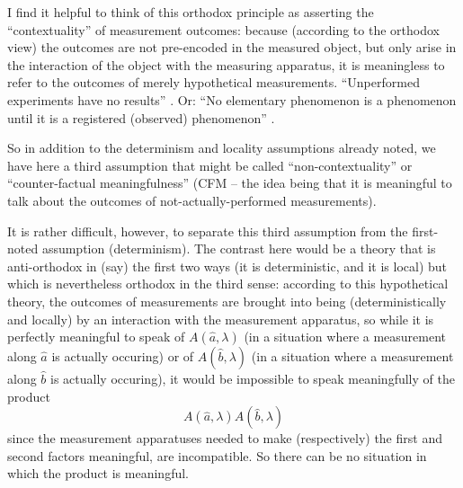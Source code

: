 \documentclass[aps,prc,onecolumn,12pt,nofootinbib]{revtex4-2}
\begin{document}
I find it helpful to think of this orthodox principle as asserting the
``contextuality'' of measurement outcomes:  because (according to the
orthodox view) the outcomes are not pre-encoded in the measured object, but
only arise in the interaction of the  object with the measuring
apparatus, it is meaningless to refer to the outcomes of merely
hypothetical measurements.  ``Unperformed experiments have no
results'' \cite{peres}.  Or:  ``No elementary phenomenon is a
phenomenon until it is a registered (observed) phenomenon'' \cite{wheeler}.

So in addition to the determinism and locality assumptions already
noted, we have here a third assumption that might be called
``non-contextuality'' or ``counter-factual meaningfulness'' (CFM --
the idea being that it is meaningful to talk about the outcomes of
not-actually-performed measurements).

It is rather difficult, however, to separate this third assumption
from the first-noted assumption (determinism).  The contrast here
would be a theory that is anti-orthodox in (say) the first two ways
(it is deterministic, and it is local) but which is nevertheless
orthodox in the third sense:  according to this
hypothetical theory, the outcomes
of measurements are brought into being (deterministically and locally)
by an interaction with the measurement apparatus, so while it is
perfectly meaningful to speak of $A(\hat{a},\lambda)$ (in a situation
where a measurement along $\hat{a}$ is actually occuring) or of
$A(\hat{b},\lambda)$ (in a situation where a measurement along
  $\hat{b}$ is actually occuring), it would be impossible to speak
  meaningfully of the product
\begin{equation}
A(\hat{a},\lambda) A(\hat{b},\lambda)
\end{equation}
since the measurement apparatuses needed to make (respectively) the
first and second factors meaningful, are incompatible.  So there can
be no situation in which the product is meaningful.
\end{document}
